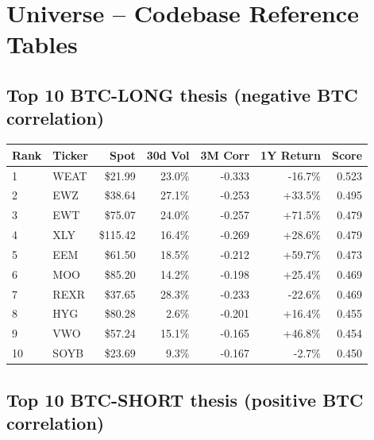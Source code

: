 \documentclass[11pt,letterpaper]{article}
\begin{document}
\section{Universe -- Codebase Reference Tables}

\subsection{Top 10 BTC-LONG thesis (negative BTC correlation)}

\begin{longtable}{l l r r r r r}
\toprule
Rank & Ticker & Spot & 30d Vol & 3M Corr & 1Y Return & Score \\
\midrule
\endhead
1  & WEAT  & \$21.99   & 23.0\% & -0.333 & -16.7\%                 & 0.523 \\
2  & EWZ   & \$38.64   & 27.1\% & -0.253 & \textcolor{gain}{+33.5\%} & 0.495 \\
3  & EWT   & \$75.07   & 24.0\% & -0.257 & \textcolor{gain}{+71.5\%} & 0.479 \\
4  & XLY   & \$115.42  & 16.4\% & -0.269 & \textcolor{gain}{+28.6\%} & 0.479 \\
5  & EEM   & \$61.50   & 18.5\% & -0.212 & \textcolor{gain}{+59.7\%} & 0.473 \\
6  & MOO   & \$85.20   & 14.2\% & -0.198 & \textcolor{gain}{+25.4\%} & 0.469 \\
7  & REXR  & \$37.65   & 28.3\% & -0.233 & -22.6\%                 & 0.469 \\
8  & HYG   & \$80.28   & 2.6\%  & -0.201 & \textcolor{gain}{+16.4\%} & 0.455 \\
9  & VWO   & \$57.24   & 15.1\% & -0.165 & \textcolor{gain}{+46.8\%} & 0.454 \\
10 & SOYB  & \$23.69   & 9.3\%  & -0.167 & -2.7\%                  & 0.450 \\
\bottomrule
\end{longtable}

\subsection{Top 10 BTC-SHORT thesis (positive BTC correlation)}
\end{document}
